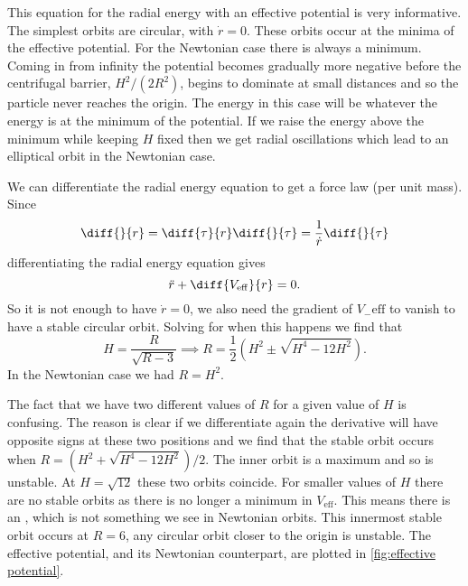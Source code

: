 \documentclass[fleqn]{NotesClass}
\begin{document}
    This equation for the radial energy with an effective potential is very informative.
    The simplest orbits are circular, with \(\dot{r} = 0\).
    These orbits occur at the minima of the effective potential.
    For the Newtonian case there is always a minimum.
    Coming in from infinity the potential becomes gradually more negative before the centrifugal barrier, \(H^2/(2R^2)\), begins to dominate at small distances and so the particle never reaches the origin.
    The energy in this case will be whatever the energy is at the minimum of the potential.
    If we raise the energy above the minimum while keeping \(H\) fixed then we get radial oscillations which lead to an elliptical orbit in the Newtonian case.
    
    We can differentiate the radial energy equation to get a force law (per unit mass).
    Since
    \begin{equation}
        \diff{}{r} = \diff{\tau}{r}\diff{}{\tau} = \frac{1}{\dot{r}}\diff{}{\tau}
    \end{equation}
    differentiating the radial energy equation gives
    \begin{equation}
        \ddot{r} + \diff{V_{\mathrm{eff}}}{r} = 0.
    \end{equation}
    So it is not enough to have \(\dot{r} = 0\), we also need the gradient of \(V_-\mathrm{eff}\) to vanish to have a stable circular orbit.
    Solving for when this happens we find that
    \begin{equation}
        H = \frac{R}{\sqrt{R - 3}} \implies R = \frac{1}{2}(H^2 \pm \sqrt{H^4 - 12H^2}).
    \end{equation}
    In the Newtonian case we had \(R = H^2\).
    
    The fact that we have two different values of \(R\) for a given value of \(H\) is confusing.
    The reason is clear if we differentiate again the derivative will have opposite signs at these two positions and we find that the stable orbit occurs when \(R = (H^2 + \sqrt{H^4 - 12H^2})/2\).
    The inner orbit is a maximum and so is unstable.
    At \(H = \sqrt{12}\) these two orbits coincide.
    For smaller values of \(H\) there are no stable orbits as there is no longer a minimum in \(V_{\mathrm{eff}}\).
    This means there is an , which is not something we see in Newtonian orbits.
    This innermost stable orbit occurs at \(R = 6\), any circular orbit closer to the origin is unstable.
    The effective potential, and its Newtonian counterpart, are plotted in \cref{fig:effective potential}.
    
\end{document}
